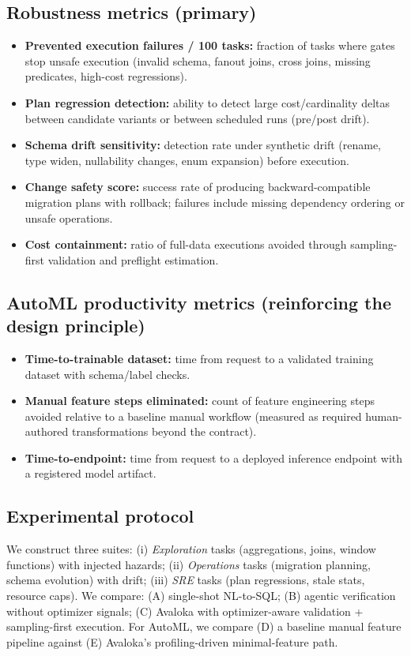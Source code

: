 \documentclass{article} %
\begin{document}
\subsection{Robustness metrics (primary)}
\begin{itemize}
  \item \textbf{Prevented execution failures / 100 tasks:} fraction of tasks where gates stop unsafe execution
  (invalid schema, fanout joins, cross joins, missing predicates, high-cost regressions).
  \item \textbf{Plan regression detection:} ability to detect large cost/cardinality deltas between candidate
  variants or between scheduled runs (pre/post drift).
  \item \textbf{Schema drift sensitivity:} detection rate under synthetic drift (rename, type widen, nullability
  changes, enum expansion) before execution.
  \item \textbf{Change safety score:} success rate of producing backward-compatible migration plans with rollback;
  failures include missing dependency ordering or unsafe operations.
  \item \textbf{Cost containment:} ratio of full-data executions avoided through sampling-first validation and
  preflight estimation.
\end{itemize}

\subsection{AutoML productivity metrics (reinforcing the design principle)}
\begin{itemize}
  \item \textbf{Time-to-trainable dataset:} time from request to a validated training dataset with schema/label checks.
  \item \textbf{Manual feature steps eliminated:} count of feature engineering steps avoided relative to a baseline
  manual workflow (measured as required human-authored transformations beyond the contract).
  \item \textbf{Time-to-endpoint:} time from request to a deployed inference endpoint with a registered model artifact.
\end{itemize}

\subsection{Experimental protocol}
We construct three suites:
(i) \emph{Exploration} tasks (aggregations, joins, window functions) with injected hazards;
(ii) \emph{Operations} tasks (migration planning, schema evolution) with drift;
(iii) \emph{SRE} tasks (plan regressions, stale stats, resource caps).
We compare:
(A) single-shot NL-to-SQL; (B) agentic verification without optimizer signals; (C) Avaloka with optimizer-aware
validation + sampling-first execution. For AutoML, we compare (D) a baseline manual feature pipeline against
(E) Avaloka's profiling-driven minimal-feature path.
\end{document}
